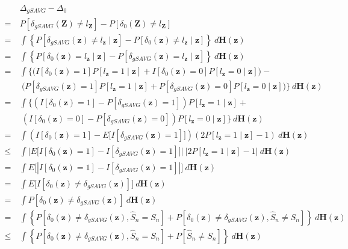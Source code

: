 \documentclass[twoside]{article}
\newcommand{\bZ}{\mathbf{Z}}
\newcommand{\bH}{\mathbf{H}}
\newcommand{\bz}{\mathbf{z}}
\newcommand{\0}{\mathbf{0}}
\newcommand{\1}{\mathbf{1}}
\numberwithin{equation}{section}
\begin{document}
\begin{align}\label{nref11}
    &\ \Delta_{gSAVG} - \Delta_{0}\nonumber \\
    =&\ P[\delta_{gSAVG}(\bZ)\neq l_{\bZ}]- P[\delta_{0}(\bZ)\neq l_{\bZ}]\nonumber\\
    =&\ \int \left \{P[\delta_{gSAVG}(\bz)\neq l_{\bz}\mid \bz]- P[\delta_{0}(\bz)\neq l_{\bz}\mid \bz]\right \}\ d\bH(\bz)\nonumber\\
    =&\ \int \left \{P[\delta_{0}(\bz)= l_{\bz}\mid \bz]- P[\delta_{gSAVG}(\bz)= l_{\bz}\mid \bz]\right\}\ d\bH(\bz)\nonumber\\
    =&\ \int \big \{\big (I[\delta_{0}(\bz)=1]P[ l_{\bz}=1\mid \bz] + I[\delta_{0}(\bz)=0]P[ l_{\bz}=0\mid \bz]\big )-\nonumber\\ 
    &\ \ \big (P[\delta_{gSAVG}(\bz)=1]P[ l_{\bz}=1\mid \bz] + P[\delta_{gSAVG}(\bz)=0]P[ l_{\bz}=0\mid \bz]\big)\big \}\ d\bH(\bz)\nonumber\\
    =&\ \int \big \{(I[\delta_{0}(\bz)=1] - P[\delta_{gSAVG}(\bz)=1])P[ l_{\bz}=1\mid \bz] +\nonumber\\
    &\ \ (I[\delta_{0}(\bz)=0] - P[\delta_{gSAVG}(\bz)=0])P[ l_{\bz}=0\mid \bz]\big \}\ d\bH(\bz)\nonumber\\
    =&\ \int (I[\delta_{0}(\bz)=1] - E\big [I[\delta_{gSAVG}(\bz)=1]\big ])(2P[ l_{\bz}=1\mid \bz]-1)\ d\bH(\bz)\nonumber\\
    \leq &\ \int \big |E\big [I[\delta_{0}(\bz)=1] - I[\delta_{gSAVG}(\bz)=1]\big ]\big |\ |2P[ l_{\bz}=1\mid \bz]-1|\ d\bH(\bz)\nonumber\\
    = &\ \int E\big [|I[\delta_{0}(\bz)=1] - I[\delta_{gSAVG}(\bz)=1]|\big ]\ d\bH(\bz)\nonumber\\
    = &\ \int E\big [I[\delta_{0}(\bz)\neq \delta_{gSAVG}(\bz)]\big ]\ d\bH(\bz)\nonumber\\
    = &\ \int P[\delta_{0}(\bz)\neq \delta_{gSAVG}(\bz)]\ d\bH(\bz)\nonumber\\
    = &\ \int \left \{P[\delta_{0}(\bz)\neq \delta_{gSAVG}(\bz), \hat{S}_n=S_n] + P[\delta_{0}(\bz)\neq \delta_{gSAVG}(\bz), \hat{S}_n\neq S_n]\right \}\ d\bH(\bz)\nonumber\\
    \leq  &\ \int \left \{ P[\delta_{0}(\bz)\neq \delta_{gSAVG}(\bz), \hat{S}_n=S_n] +P[\hat{S}_n\neq S_n]\right \}\ d\bH(\bz)\nonumber\\

\end{align}
\end{document}
